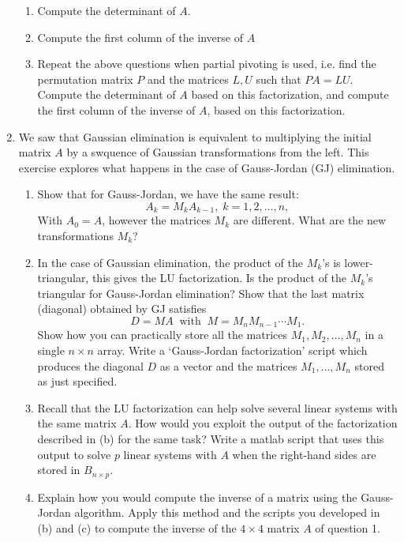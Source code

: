 \documentclass[11pt]{article}
\begin{document}
\begin{enumerate}
\begin{enumerate}
		      \item Compute the determinant of \(A\).

		      \item Compute the first column of the inverse of \(A\)

		      \item Repeat the above questions when partial pivoting is used, i.e. find the permutation matrix \(P\) and the matrices \(L,U\) such that \(PA = LU\).  Compute the determinant of \(A\) based on this factorization, and compute the first column of the inverse of \(A\), based on this factorization.
	      \end{enumerate}

	\item We saw that Gaussian elimination is equivalent to multiplying the initial matrix \(A\) by a swquence of Gaussian transformations from the left.  This exercise explores what happens in the case of Gauss-Jordan (GJ) elimination.
	      \begin{enumerate}
		      \item Show that for Gauss-Jordan, we have the same result:
		            \[A_k = M_kA_{k-1}, \; k = 1, 2, \dots, n,\]
		            With \(A_0 = A\), however the matrices \(M_k\) are different.  What are the new transformations \(M_k\)?

		      \item In the case of Gaussian elimination, the product of the \(M_k\)'s is lower-triangular, this gives the LU factorization.  Is the product of the \(M_k\)'s triangular for Gauss-Jordan elimination?  Show that the last matrix (diagonal) obtained by GJ satisfies
		            \[D = MA \;\; \text{with} \;\; M = M_n M_{n-1} \cdots M_1.\]
		            Show how you can practically store all the matrices \(M_1, M_2, \dots, M_n\) in a single \(n \times n\) array.  Write a `Gauss-Jordan factorization' script which produces the diagonal \(D\) as a vector and the matrices \(M_1, \dots, M_n\) stored as just specified.

		      \item Recall that the LU factorization can help solve several linear systems with the same matrix \(A\).  How would you exploit the output of the factorization described in (b) for the same task?  Write a matlab script that uses this output to solve \(p\) linear systems with \(A\) when the right-hand sides are stored in \(B_{n \times p}\).

		      \item Explain how you would compute the inverse of a matrix using the Gauss-Jordan algorithm.  Apply this method and the scripts you developed in (b) and (c) to compute the inverse of the \(4 \times 4\) matrix \(A\) of question 1.
	      \end{enumerate}


\end{enumerate}
\end{document}
